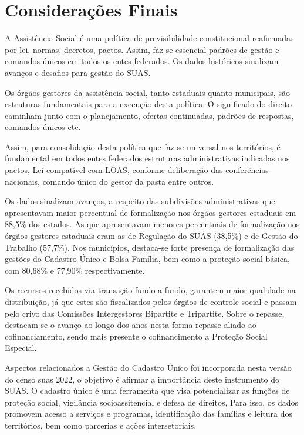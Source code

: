 \documentclass[
  brazilian]{report}
\begin{document}
\hypertarget{considerauxe7uxf5es-finais}{%
\section{Considerações Finais}\label{considerauxe7uxf5es-finais}}

A Assistência Social é uma política de previsibilidade constitucional
reafirmadas por lei, normas, decretos, pactos. Assim, faz-se essencial
padrões de gestão e comandos únicos em todos os entes federados. Os
dados históricos sinalizam avanços e desafios para gestão do SUAS.

Os órgãos gestores da assistência social, tanto estaduais quanto
municipais, são estruturas fundamentais para a execução desta política.
O significado do direito caminham junto com o planejamento, ofertas
continuadas, padrões de respostas, comandos únicos etc.

Assim, para consolidação desta política que faz-se universal nos
territórios, é fundamental em todos entes federados estruturas
administrativas indicadas nos pactos, Lei compatível com LOAS, conforme
deliberação das conferências nacionais, comando único do gestor da pasta
entre outros.

Os dados sinalizam avanços, a respeito das subdivisões administrativas
que apresentavam maior percentual de formalização nos órgãos gestores
estaduais em 88,5\% dos estados. As que apresentavam menores percentuais
de formalização nos órgãos gestores estaduais eram as de Regulação do
SUAS (38,5\%) e de Gestão do Trabalho (57,7\%). Nos municípios,
destaca-se forte presença de formalização das gestões do Cadastro Único
e Bolsa Família, bem como a proteção social básica, com 80,68\% e
77,90\% respectivamente.

Os recursos recebidos via transação fundo-a-fundo, garantem maior
qualidade na distribuição, já que estes são fiscalizados pelos órgãos de
controle social e passam pelo crivo das Comissões Intergestores
Bipartite e Tripartite. Sobre o repasse, destacam-se o avanço ao longo
dos anos nesta forma repasse aliado ao cofinanciamento, sendo mais
presente o cofinancimento a Proteção Social Especial.

Aspectos relacionados a Gestão do Cadastro Único foi incorporada nesta
versão do censo suas 2022, o objetivo é afirmar a importância deste
instrumento do SUAS. O cadastro único é uma ferramenta que visa
potencializar as funções de proteção social, vigilância socioassitencial
e defesa de direitos, Para isso, os dados promovem acesso a serviços e
programas, identificação das famílias e leitura dos territórios, bem
como parcerias e ações intersetoriais.
\end{document}

